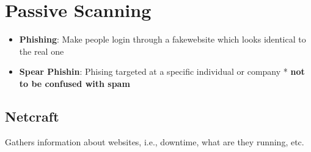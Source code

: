 \section{Passive Scanning}
\begin{flushleft}
\begin{itemize}
	\item \textbf{Phishing}: Make people login through a fakewebsite which looks identical to the real one
	\item \textbf{Spear Phishin}: Phising targeted at a specific individual or company
* \textbf{not to be confused with spam}
\end{itemize}

\subsection{Netcraft}
Gathers information about websites, i.e., downtime, what are they running, etc.

\end{flushleft}

